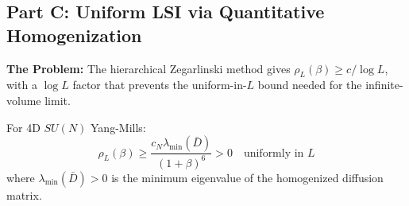 \subsection{Part C: Uniform LSI via Quantitative Homogenization}
\label{subsec:gap-c-resolution}

\textbf{The Problem:} The hierarchical Zegarlinski method gives 
$\rho_L(\beta) \geq c/\log L$, with a $\log L$ factor that prevents the 
uniform-in-$L$ bound needed for the infinite-volume limit.

\begin{theorem}
\label{thm:gap-c-homogenization}
For 4D $SU(N)$ Yang-Mills:
\[
\boxed{\rho_L(\beta) \geq \frac{c_N \lambda_{\min}(\bar{D})}{(1+\beta)^6} > 0 \quad \text{uniformly in } L}
\]
where $\lambda_{\min}(\bar{D}) > 0$ is the minimum eigenvalue of the 
homogenized diffusion matrix.
\end{theorem}

